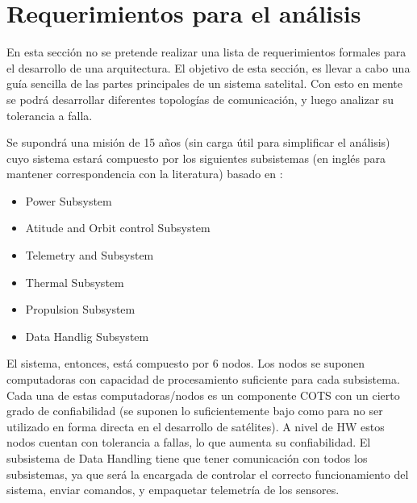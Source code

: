 \section{Requerimientos para el análisis}\label{sec:req_analisis}
En esta sección no se pretende realizar una lista de requerimientos formales para el desarrollo de una arquitectura. El objetivo de esta sección, es llevar a cabo una guía sencilla de las partes principales de un sistema satelital. Con esto en mente se podrá desarrollar diferentes topologías de comunicación, y luego analizar su tolerancia a falla.

Se supondrá una misión de 15 años (sin carga útil para simplificar el análisis) cuyo sistema estará compuesto por los siguientes subsistemas (en inglés para mantener correspondencia con la literatura) basado en \cite{Fontescue03}:
\begin{itemize}
\item Power Subsystem
\item Atitude and Orbit control Subsystem
\item Telemetry and Subsystem
\item Thermal Subsystem
\item Propulsion Subsystem
\item Data Handlig Subsystem
\end{itemize}

El sistema, entonces, está compuesto por 6 nodos. Los nodos se suponen computadoras con capacidad de procesamiento suficiente para cada subsistema. Cada una de estas computadoras/nodos es un componente COTS con un cierto grado de confiabilidad (se suponen lo suficientemente bajo como para no ser utilizado en forma directa en el desarrollo de satélites). A nivel de \ac{HW} estos nodos cuentan con tolerancia a fallas, lo que aumenta su confiabilidad. El subsistema de Data Handling tiene que tener comunicación con todos los subsistemas, ya que será la encargada de controlar el correcto funcionamiento del sistema, enviar comandos, y empaquetar telemetría de los sensores.



